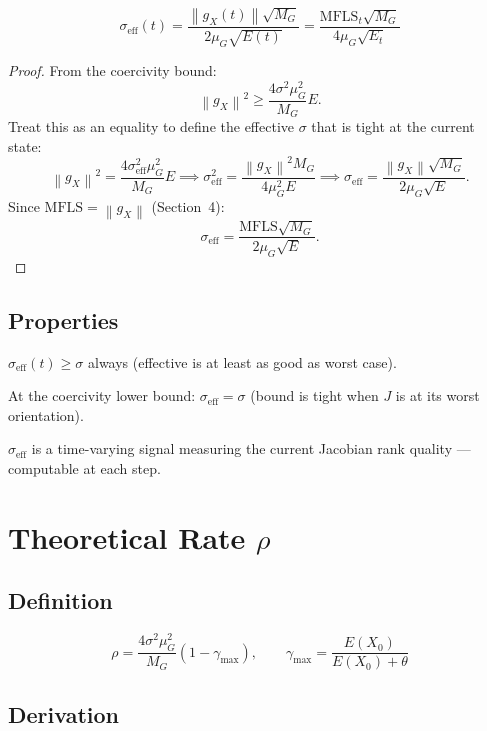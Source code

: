\documentclass[11pt,a4paper]{article}
\theoremstyle{definition}
\newcommand{\norm}[1]{\left\|#1\right\|}
\newcommand{\gX}{g_X}
\newcommand{\mfls}{\mathrm{MFLS}}
\begin{document}
\begin{lockedbox}
\[
\sigma_\mathrm{eff}(t) = \frac{\norm{\gX(t)}\sqrt{M_G}}{2\mu_G\sqrt{E(t)}} = \frac{\mfls_t\sqrt{M_G}}{4\mu_G\sqrt{E_t}}
\]
\end{lockedbox}

\begin{proof}
From the coercivity bound:
\[
\norm{\gX}^2 \geq \frac{4\sigma^2\mu_G^2}{M_G}E.
\]
Treat this as an equality to define the effective $\sigma$ that is tight at the current state:
\[
\norm{\gX}^2 = \frac{4\sigma_\mathrm{eff}^2\mu_G^2}{M_G}E
\implies
\sigma_\mathrm{eff}^2 = \frac{\norm{\gX}^2 M_G}{4\mu_G^2 E}
\implies
\sigma_\mathrm{eff} = \frac{\norm{\gX}\sqrt{M_G}}{2\mu_G\sqrt{E}}.
\]
Since $\mfls = \norm{\gX}$ (Section~4):
\[
\sigma_\mathrm{eff} = \frac{\mfls\sqrt{M_G}}{2\mu_G\sqrt{E}}.
\]
\end{proof}

\subsection{Properties}

$\sigma_\mathrm{eff}(t) \geq \sigma$ always (effective is at least as good as worst case).

At the coercivity lower bound: $\sigma_\mathrm{eff} = \sigma$ (bound is tight when $J$ is at its worst orientation).

$\sigma_\mathrm{eff}$ is a time-varying signal measuring the current Jacobian rank quality — computable at each step.

\section{Theoretical Rate $\rho$}

\subsection{Definition}

\begin{lockedbox}
\[
\rho = \frac{4\sigma^2\mu_G^2}{M_G}(1-\gamma_\mathrm{max}), \qquad
\gamma_\mathrm{max} = \frac{E(X_0)}{E(X_0)+\theta}
\]
\end{lockedbox}

\subsection{Derivation}
\end{document}
